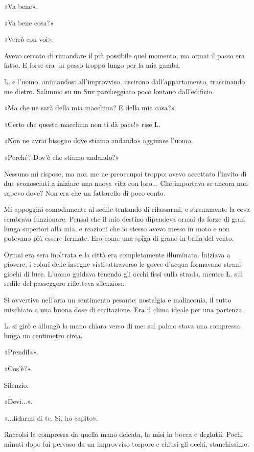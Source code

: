 \documentclass[a4paper,11pt,oneside,openright,final]{memoir}
\begin{document}
«Va bene».

«Va bene cosa?»

«Verrò con voi».

Avevo cercato di rimandare il più possibile quel momento, ma ormai il passo era
fatto. E forse era un passo troppo lungo per la mia gamba.

L. e l'uomo, animandosi all'improvviso, uscirono dall'appartamento, trascinando
me dietro. Salimmo su un Suv parcheggiato poco lontano dall'edificio.

«Ma che ne sarà della mia macchina? E della mia casa?».

«Certo che questa macchina non ti dà pace!» rise L.

«Non ne avrai bisogno dove stiamo andando» aggiunse l'uomo.

«Perché? Dov'è che stiamo andando?»

Nessuno mi rispose, ma non me ne preoccupai troppo: avevo accettato l'invito
di due sconosciuti a iniziare una nuova vita con loro... Che importava se ancora
non sapevo dove? Non era che un fattarello di poco conto.

Mi appoggiai comodamente al sedile tentando di rilassarmi, e stranamente la
cosa sembrava funzionare. Pensai che il mio destino dipendeva ormai da forze di
gran lunga superiori alla mia, e reazioni che io stesso avevo messo in moto e
non potevano più essere fermate. Ero come una spiga di grano in balia del
vento.

Ormai era sera inoltrata e la città era completamente illuminata. Iniziava a
piovere; i colori delle insegne visti attraverso le gocce d'acqua formavano
strani giochi di luce. L'uomo guidava tenendo gli occhi fissi sulla strada,
mentre L. sul sedile del passeggero rifletteva silenziosa.

Si avvertiva nell'aria un sentimento pesante: nostalgia e malinconia, il tutto
mischiato a una buona dose di eccitazione. Era il clima ideale per una partenza.

L. si girò e allungò la mano chiara verso di me: sul palmo stava una compressa
lunga un centimetro circa.

«Prendila».

«Cos'è?».

Silenzio.

«Devi...».

«...fidarmi di te. Sì, ho capito».

Raccolsi la compressa da quella mano deicata, la misi in bocca e deglutii. Pochi
minuti dopo fui pervaso da un improvviso torpore e chiusi gli occhi,
stanchissimo.
\end{document}
